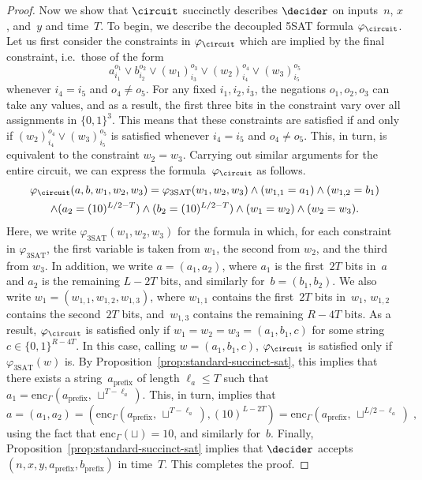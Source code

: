 \begin{proof}
  Now we show that $\circuit$ succinctly describes $\decider$ on inputs~$n$,
  $x$, and~$y$ and time~$T$.
  To begin, we describe the decoupled 5SAT formula $\varphi_{\circuit}$.
  Let us first consider the constraints in $\varphi_{\circuit}$ which are
  implied by the final constraint, i.e.\ those of the form
  \begin{equation*}
    a_{i_1}^{o_1} \lor b_{i_2}^{o_2} \lor (w_1)_{i_3}^{o_3} \lor (w_2)_{i_4}^{o_4}
    \lor (w_3)_{i_5}^{o_5}
  \end{equation*}
  whenever $i_4 = i_5$ and $o_4 \neq o_5$.
  For any fixed $i_1, i_2, i_3$, the negations $o_1, o_2, o_3$ can take any
  values, and as a result, the first three bits in the constraint vary over all
  assignments in $\{0, 1\}^3$.
  This means that these constraints are satisfied if and only if
  $(w_2)_{i_4}^{o_4} \lor (w_3)_{i_5}^{o_5}$ is satisfied whenever $i_4 = i_5$
  and $o_4 \neq o_5$.
  This, in turn, is equivalent to the constraint $w_2 = w_3$.
  Carrying out similar arguments for the entire circuit, we can express the
  formula~$\varphi_{\circuit}$ as follows.
  \begin{multline*}
    \varphi_{\circuit}(a, b, w_1, w_2, w_3)
    =
    \varphi_{\mathrm{3SAT}}(w_1, w_2, w_3)
    \land (w_{1, 1} = a_1) \land (w_{1, 2} = b_1)\\
    \land (a_2= (10)^{L/2 -T}) \land (b_2 = (10)^{L/2-T})
    \land (w_1 = w_2)
    \land (w_2 = w_3).
  \end{multline*}
  Here, we write $\varphi_{\mathrm{3SAT}}(w_1, w_2, w_3)$ for the formula in
  which, for each constraint in $\varphi_{\mathrm{3SAT}}$, the first variable is
  taken from $w_1$, the second from $w_2$, and the third from $w_3$.
  In addition, we write $a = (a_1, a_2)$, where $a_1$ is the first~$2T$ bits
  in~$a$ and $a_2$ is the remaining $L-2T$ bits, and similarly for~$b = (b_1,
  b_2)$.
  We also write $w_1 = (w_{1,1}, w_{1,2}, w_{1,3})$, where $w_{1, 1}$ contains
  the first~$2T$ bits in~$w_1$, $w_{1,2}$ contains the second~$2T$ bits,
  and~$w_{1,3}$ contains the remaining $R-4T$ bits.
  As a result, $\varphi_{\circuit}$ is satisfied only if $w_1 = w_2 = w_3 =
  (a_1, b_1, c)$ for some string $c \in \{0, 1\}^{R-4T}$.
  In this case, calling $w = (a_1, b_1, c)$, $\varphi_{\circuit}$ is satisfied
  only if $\varphi_{\mathrm{3SAT}}(w)$ is.
  By Proposition~\ref{prop:standard-succinct-sat}, this implies that there exists a
  string~$a_{\mathrm{prefix}}$ of length $\ell_a \leq T$ such that $ a_1 =
  \mathrm{enc}_\Gamma(a_{\mathrm{prefix}},\,\sqcup^{T-\ell_a})$.
  This, in turn, implies that
  \begin{equation*}
    a = (a_1, a_2) = (\mathrm{enc}_\Gamma(a_{\mathrm{prefix}},\,
    \sqcup^{T-\ell_a}), (10)^{L-2T})
    = \mathrm{enc}_\Gamma(a_{\mathrm{prefix}},\,\sqcup^{L/2-\ell_a})\;,
  \end{equation*}
  using the fact that $\mathrm{enc}_\Gamma(\sqcup) = 10$, and similarly for~$b$.
  Finally, Proposition~\ref{prop:standard-succinct-sat} implies that $\decider$
  accepts $(n, x, y, a_{\mathrm{prefix}}, b_{\mathrm{prefix}})$ in time~$T$.
  This completes the proof.
\end{proof}

